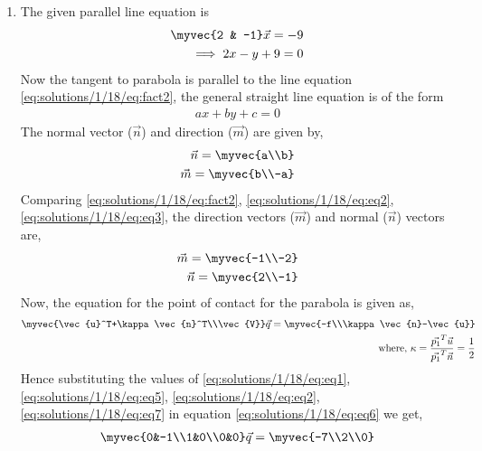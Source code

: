 	\begin{enumerate}
		\item
							The given parallel line equation is
		\begin{align} 
			\myvec{2 & -1}\vec{x}= -9 \\
			\implies 2x - y + 9 = 0 \label{eq:solutions/1/18/eq:fact2}
		\end{align}
		Now the tangent to parabola is parallel to the line equation \eqref{eq:solutions/1/18/eq:fact2}, the general straight line equation is of the form
		\begin{align}
			ax + by + c = 0
		\end{align}
		The normal vector ($\vec{n}$) and direction ($\vec{m}$) are given by,
		\begin{align} 
			\vec{n} = \myvec{a\\b} \label{eq:solutions/1/18/eq:eq3}\\
			\vec{m} = \myvec{b\\-a} \label{eq:solutions/1/18/eq:eq4}
		\end{align}
		Comparing \eqref{eq:solutions/1/18/eq:fact2}, \eqref{eq:solutions/1/18/eq:eq2}, \eqref{eq:solutions/1/18/eq:eq3}, the direction vectors ($\vec{m}$) and normal ($\vec{n}$)  vectors are,
		\begin{align}
			\vec{m} = \myvec{-1\\-2}\\
			\vec{n} = \myvec{2\\-1}\label{eq:solutions/1/18/eq:eq5}
		\end{align} 
		Now, the equation for the point of contact for the parabola is given as,
		\begin{align}
			\myvec{\vec{u}^T+\kappa\vec{n}^T\\\vec{V}}\vec{q} = \myvec{-f\\\kappa\vec{n}-\vec{u}}\label{eq:solutions/1/18/eq:eq6}\\
			\mbox{where, } \kappa = \frac{\vec{p_1}^T\vec{u}}{\vec{p_1}^T\vec{n}} = \frac{1}{2} \label{eq:solutions/1/18/eq:eq7}
		\end{align}
		Hence substituting the values of \eqref{eq:solutions/1/18/eq:eq1}, \eqref{eq:solutions/1/18/eq:eq5}, \eqref{eq:solutions/1/18/eq:eq2}, \eqref{eq:solutions/1/18/eq:eq7} in equation \eqref{eq:solutions/1/18/eq:eq6} we get,
		\begin{align}
			\myvec{0&-1\\1&0\\0&0}\vec{q} = \myvec{-7\\2\\0}

\end{align}
\end{enumerate}
